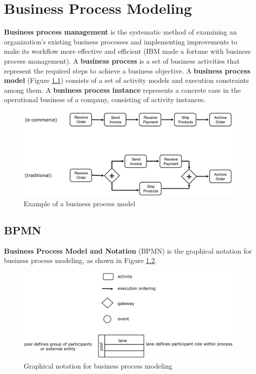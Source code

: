 \chapter{Business Process Modeling}

\textbf{Business process management} is the systematic method of examining an organization's existing business processes and implementing improvements to make its workflow more effective and efficient (IBM made a fortune with business process management). A \textbf{business process} is a set of business activities that represent the required steps to achieve a business objective. A \textbf{business process model} (Figure \ref{fig:business-model-example}) consists of a set of activity models and execution constraints among them. A \textbf{business process instance} represents a concrete case in the operational business of a company, consisting of activity instances.

\begin{figure} [H]
    \centering
    \includegraphics[width=1\textwidth]{images/BusinessProcessModeling/business-model-example.PNG}
    \caption{Example of a business process model}
    \label{fig:business-model-example}
\end{figure} 

\section{BPMN}

\textbf{Business Process Model and Notation} (BPMN) is the graphical notation for business process modeling, as shown in Figure \ref{fig:BPMN}.

\begin{figure} [H]
    \centering
    \includegraphics[width=1\textwidth]{images/BusinessProcessModeling/BPMN.PNG}
    \caption{Graphical notation for business process modeling}
    \label{fig:BPMN}
\end{figure} 

